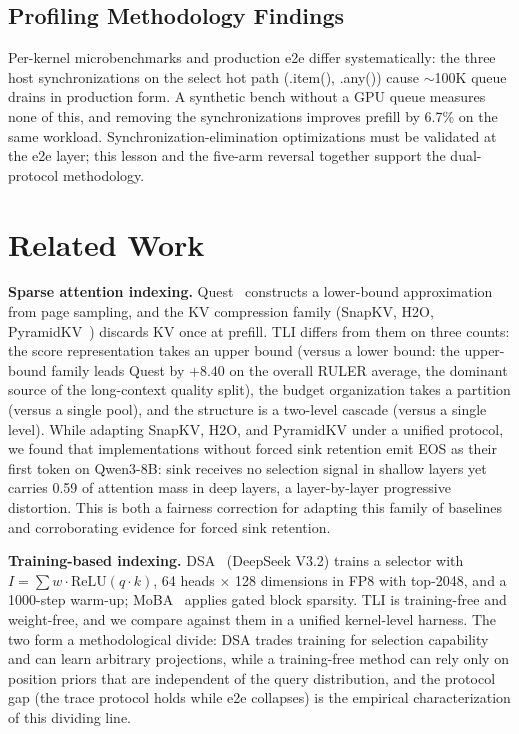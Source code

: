 \documentclass[11pt]{article}
\begin{document}
\subsection{Profiling Methodology Findings}

Per-kernel microbenchmarks and production e2e differ systematically: the three host synchronizations on the select hot path (.item(), .any()) cause $\sim$100K queue drains in production form. A synthetic bench without a GPU queue measures none of this, and removing the synchronizations improves prefill by 6.7\% on the same workload. Synchronization-elimination optimizations must be validated at the e2e layer; this lesson and the five-arm reversal together support the dual-protocol methodology.

\section{Related Work}

\textbf{Sparse attention indexing.} Quest~\cite{quest} constructs a lower-bound approximation from page sampling, and the KV compression family (SnapKV, H2O, PyramidKV~\cite{snapkv,h2o,pyramidkv}) discards KV once at prefill. TLI differs from them on three counts: the score representation takes an upper bound (versus a lower bound: the upper-bound family leads Quest by $+8.40$ on the overall RULER average, the dominant source of the long-context quality split), the budget organization takes a partition (versus a single pool), and the structure is a two-level cascade (versus a single level). While adapting SnapKV, H2O, and PyramidKV under a unified protocol, we found that implementations without forced sink retention emit EOS as their first token on Qwen3-8B: sink receives no selection signal in shallow layers yet carries 0.59 of attention mass in deep layers, a layer-by-layer progressive distortion. This is both a fairness correction for adapting this family of baselines and corroborating evidence for forced sink retention.

\textbf{Training-based indexing.} DSA~\cite{dsa} (DeepSeek V3.2) trains a selector with $I=\sum w\cdot\mathrm{ReLU}(q\cdot k)$, 64 heads $\times$ 128 dimensions in FP8 with top-2048, and a 1000-step warm-up; MoBA~\cite{moba} applies gated block sparsity. TLI is training-free and weight-free, and we compare against them in a unified kernel-level harness. The two form a methodological divide: DSA trades training for selection capability and can learn arbitrary projections, while a training-free method can rely only on position priors that are independent of the query distribution, and the protocol gap (the trace protocol holds while e2e collapses) is the empirical characterization of this dividing line.
\end{document}
